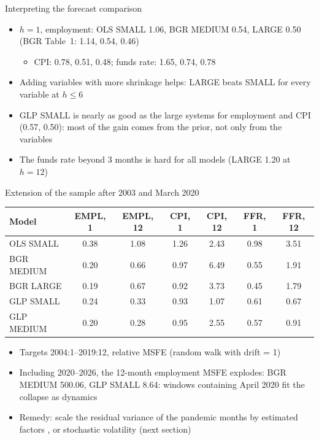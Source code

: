 \begin{frame}{Interpreting the forecast comparison}
\itemsize{\small}
\begin{itemize}
    \item $h = 1$, employment: OLS SMALL 1.06, BGR MEDIUM 0.54, LARGE 0.50 (BGR Table~1: 1.14, 0.54, 0.46)
    \begin{itemize}
        \item CPI: 0.78, 0.51, 0.48; funds rate: 1.65, 0.74, 0.78
    \end{itemize}
    \item Adding variables with more shrinkage helps: LARGE beats SMALL for every variable at $h \le 6$
    \item GLP SMALL is nearly as good as the large systems for employment and CPI (0.57, 0.50): most of the gain comes from the prior, not only from the variables
    \item The funds rate beyond 3 months is hard for all models (LARGE 1.20 at $h = 12$)
\end{itemize}
\end{frame}

\begin{frame}{Extension of the sample after 2003 and March 2020}
\itemsize{\footnotesize}
\begin{center}
\scriptsize
\begin{tabular}{lcccccc}
\toprule
\textbf{Model} & \textbf{EMPL, 1} & \textbf{EMPL, 12} & \textbf{CPI, 1} & \textbf{CPI, 12} & \textbf{FFR, 1} & \textbf{FFR, 12} \\
\midrule
OLS SMALL & 0.38 & 1.08 & 1.26 & 2.43 & 0.98 & 3.51 \\
BGR MEDIUM & 0.20 & 0.66 & 0.97 & 6.49 & 0.55 & 1.91 \\
BGR LARGE & 0.19 & 0.67 & 0.92 & 3.73 & 0.45 & 1.79 \\
GLP SMALL & 0.24 & 0.33 & 0.93 & 1.07 & 0.61 & 0.67 \\
GLP MEDIUM & 0.20 & 0.28 & 0.95 & 2.55 & 0.57 & 0.91 \\
\bottomrule
\end{tabular}
\end{center}
\begin{itemize}
    \item Targets 2004:1--2019:12, relative MSFE (random walk with drift = 1)
    \item Including 2020--2026, the 12-month employment MSFE explodes: BGR MEDIUM 500.06, GLP SMALL 8.64: windows containing April 2020 fit the collapse as dynamics
    \item Remedy: scale the residual variance of the pandemic months by estimated factors , or stochastic volatility (next section)
\end{itemize}
\end{frame}

